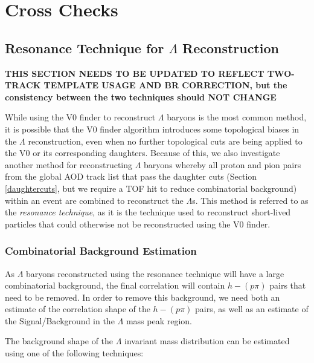 \documentclass[ALICE,manyauthors]{ALICE_analysis_notes}
\begin{document}
\clearpage




\section{Cross Checks}
\subsection{Resonance Technique for $\Lambda$ Reconstruction}
\label{resonance_technique}

\textbf{THIS SECTION NEEDS TO BE UPDATED TO REFLECT TWO-TRACK TEMPLATE USAGE AND BR CORRECTION, but the consistency between the two techniques should NOT CHANGE}

While using the V0 finder to reconstruct $\Lambda$ baryons is the most common method, it is possible that the V0 finder algorithm introduces some topological biases in the $\Lambda$ reconstruction, even when no further topological cuts are being applied to the V0 or its corresponding daughters. Because of this, we also investigate another method for reconstructing $\Lambda$ baryons whereby all proton and pion pairs from the global AOD track list that pass the daughter cuts (Section \ref{daughtercuts}, but we require a TOF hit to reduce combinatorial background) within an event are combined to reconstruct the $\Lambda$s. This method is referred to as the \textit{resonance technique}, as it is the technique used to reconstruct short-lived particles that could otherwise not be reconstructed using the V0 finder.

\subsubsection{Combinatorial Background Estimation}
\label{combinatorial_background}

As $\Lambda$ baryons reconstructed using the resonance technique will have a large combinatorial background, the final correlation will contain $h-(p\pi)$ pairs that need to be removed. In order to remove this background, we need both an estimate of the correlation shape of the $h-(p\pi)$ pairs, as well as an estimate of the Signal/Background in the $\Lambda$ mass peak region.

 The background shape of the $\Lambda$ invariant mass distribution can be estimated using one of the following techniques:
\end{document}
